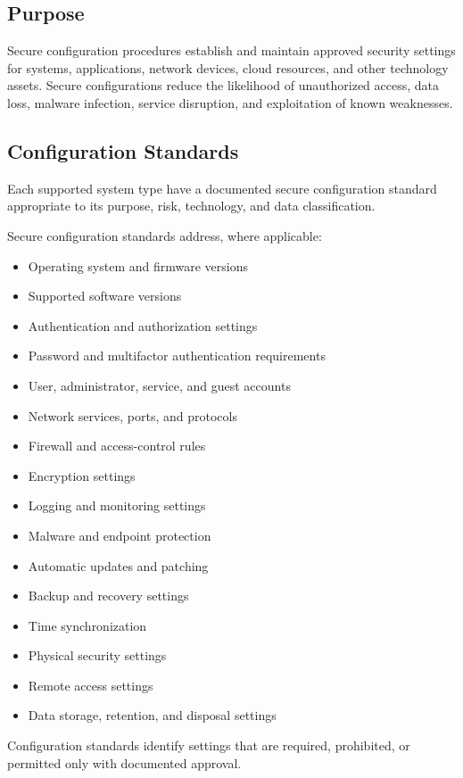 \subsection{Purpose}

Secure configuration procedures establish and maintain approved security settings for systems, applications, network devices, cloud resources, and other technology assets. Secure configurations reduce the likelihood of unauthorized access, data loss, malware infection, service disruption, and exploitation of known weaknesses.

\subsection{Configuration Standards}

Each supported system type \must{} have a documented secure configuration standard appropriate to its purpose, risk, technology, and data classification.

Secure configuration standards \should{} address, where applicable:
\begin{itemize}
    \item Operating system and firmware versions
    \item Supported software versions
    \item Authentication and authorization settings
    \item Password and multifactor authentication requirements
    \item User, administrator, service, and guest accounts
    \item Network services, ports, and protocols
    \item Firewall and access-control rules
    \item Encryption settings
    \item Logging and monitoring settings
    \item Malware and endpoint protection
    \item Automatic updates and patching
    \item Backup and recovery settings
    \item Time synchronization
    \item Physical security settings
    \item Remote access settings
    \item Data storage, retention, and disposal settings
\end{itemize}

Configuration standards \must{} identify settings that are required, prohibited, or permitted only with documented approval.

